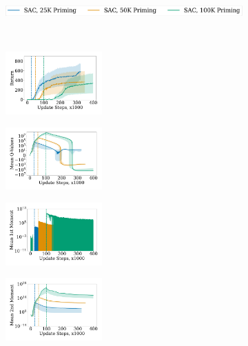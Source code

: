 \begin{figure}[t!]
\centering
    \begin{subfigure}[b]{0.8\textwidth}
        \centering
        \includegraphics[height=0.4cm]{figures/dissecting/priming/priming_base_return_legend.pdf}
    \end{subfigure}\\%
    \begin{subfigure}[b]{0.25\textwidth}
        \centering
        \includegraphics[width=3.7cm, trim=1cm 1cm 1cm 1cm ,clip]{figures/dissecting/priming/priming_base_return.pdf}
        \label{subfig:priming_base_ret}
    \end{subfigure}%
    \begin{subfigure}[b]{0.25\textwidth}
    \centering
        \includegraphics[width=3.7cm, trim=1cm 1cm 1cm 1cm ,clip]{figures/dissecting/priming/priming_base_Q.pdf}
        \label{subfig:priming_base_Q}
    \end{subfigure}%
    \begin{subfigure}[b]{0.25\textwidth}
        \centering
        \includegraphics[width=3.7cm, trim=1cm 1cm 1cm 1cm ,clip]{figures/dissecting/priming/priming_base_exp_avg.pdf}
        \label{subfig:priming_base_mom}
    \end{subfigure}%
    \begin{subfigure}[b]{0.25\textwidth}
        \centering
        \includegraphics[width=3.7cm, trim=1cm 1cm 1cm 1cm ,clip]{figures/dissecting/priming/priming_base_exp_avg_sq.pdf}

\end{subfigure}
\end{figure}
